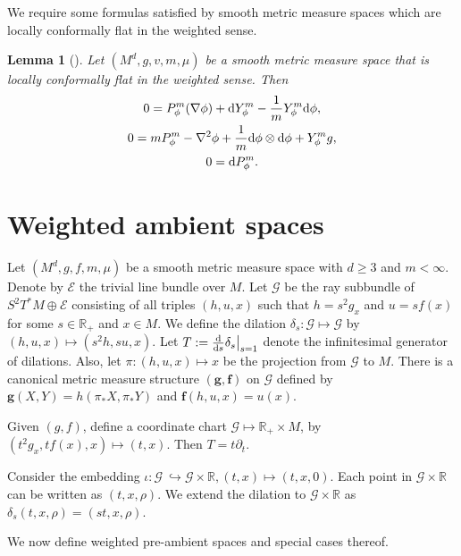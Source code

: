 \documentclass[pdftex]{sigma}
\newcommand{\mG}{\mathcal{G}}
\newcommand{\bR}{\mathbb{R}}
\numberwithin{equation}{section}
\newtheorem{Lemma}[Theorem]{Lemma}
\begin{document}
We require some formulas satisfied by smooth metric measure spaces which are locally conformally flat in the weighted sense.
\begin{Lemma}[{\cite[Lemma~3.2]{Case2014s}}]
\label{locally-conformally-flat-implications}
Let $(M^{d}, g, v, m, \mu)$ be a smooth metric measure space that is locally conformally flat in the weighted sense. Then
\begin{subequations}
\begin{gather}
0=P_{\phi}^{m}(\nabla \phi)+{\rm d}Y_{\phi}^{m}-\frac{1}{m} Y_{\phi}^{m} {\rm d}\phi,
\\
\label{second-condition-locally-conformally-flat}
0=m P_{\phi}^{m}-\nabla^{2} \phi+\frac{1}{m} {\rm d}\phi \otimes {\rm d}\phi+ Y_{\phi}^{m} g,
\\
0={\rm d} P_{\phi}^{m}.
\end{gather}
\end{subequations}
\end{Lemma}

\section{Weighted ambient spaces}
\label{sec:fg}

Let $(M^d,g,f,m,\mu)$ be a smooth metric measure space with $d\geq 3$ and $m<\infty$. Denote by $\mathcal{E}$ the trivial line bundle over $M$. Let $\mathcal{G}$ be the ray subbundle of $S^2 T^*M\oplus \mathcal{E}$ consisting of all triples $(h,u,x)$ such that $h=s^2 g_x$ and $u=sf(x)$ for some $s\in \bR_+$ and $x\in M$. We define the dilation $\delta_s\colon \mG \mapsto \mG$ by $(h,u,x)\mapsto (s^2 h,su,x)$. Let $T:=\frac{{\rm d}}{{\rm d}s}\delta_s\big|_{s=1}$ denote the infinitesimal generator of dilations. Also, let $\pi \colon (h,u,x) \mapsto x$ be the projection from $\mG$ to $M$. There is a canonical metric measure structure $(\boldsymbol{g},\boldsymbol{f})$ on $\mG$ defined by $\boldsymbol{g}(X,Y)=h(\pi_*X,\pi_*Y)$ and $\boldsymbol{f}(h,u,x)=u(x)$.

Given $(g,f)$, define a coordinate chart $\mG\mapsto \bR_+\times M$, by $(t^2g_x,tf(x),x)\mapsto (t,x)$. Then $T=t\partial_t$.

Consider the embedding $\iota \colon \mG\ \hookrightarrow \mG\times\bR,(t,x)\mapsto (t,x,0)$. Each point in $\mG\times\bR$ can be written as $(t,x,\rho)$. We extend the dilation to $\mathcal{G}\times \bR$ as $\delta_s (t,x,\rho)= (st,x,\rho)$.

We now define weighted pre-ambient spaces and special cases thereof.
\end{document}
